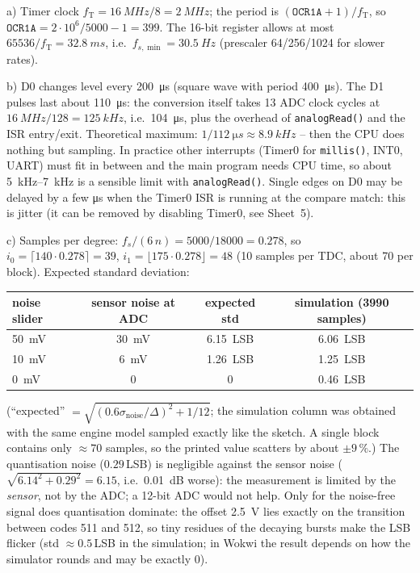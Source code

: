 \begin{solution}
a) Timer clock $f_\mathrm{T}=\SI{16}{MHz}/8=\SI{2}{MHz}$; the period is
$(\texttt{OCR1A}+1)/f_\mathrm{T}$, so $\texttt{OCR1A}=2\cdot10^6/5000-1=399$.
The 16-bit register allows at most $65536/f_\mathrm{T}=\SI{32.8}{ms}$, i.e.\
$f_{s,\min}=\SI{30.5}{Hz}$ (prescaler 64/256/1024 for slower rates).

b) D0 changes level every \SI{200}{\micro s} (square wave with period
\SI{400}{\micro s}). The D1 pulses last about \SI{110}{\micro s}: the
conversion itself takes 13 ADC clock cycles at $\SI{16}{MHz}/128=\SI{125}{kHz}$,
i.e.\ \SI{104}{\micro s}, plus the overhead of \texttt{analogRead()} and the ISR
entry/exit. Theoretical maximum: $1/\SI{112}{\micro s}\approx\SI{8.9}{kHz}$ --
then the CPU does nothing but sampling. In practice other interrupts (Timer0
for \texttt{millis()}, INT0, UART) must fit in between and the main program
needs CPU time, so about \SIrange{5}{7}{kHz} is a sensible limit with
\texttt{analogRead()}. Single edges on D0 may be delayed by a few
\si{\micro s} when the Timer0 ISR is running at the compare match: this is
jitter (it can be removed by disabling Timer0, see Sheet~5).

c) Samples per degree: $f_s/(6\,n)=5000/18000=0.278$, so
$i_0=\lceil140\cdot0.278\rceil=39$, $i_1=\lfloor175\cdot0.278\rfloor=48$
(10 samples per TDC, about 70 per block). Expected standard deviation:
\begin{center}\small
\begin{tabular}{@{}lccc@{}}\toprule
noise slider & sensor noise at ADC & expected std & simulation (3990 samples)\\\midrule
\SI{50}{mV} & \SI{30}{mV} & \SI{6.15}{LSB} & \SI{6.06}{LSB}\\
\SI{10}{mV} & \SI{6}{mV}  & \SI{1.26}{LSB} & \SI{1.25}{LSB}\\
\SI{0}{mV}  & 0 & 0 & \SI{0.46}{LSB}\\\bottomrule
\end{tabular}
\end{center}
(``expected'' $=\sqrt{(0.6\sigma_\mathrm{noise}/\Delta)^2+1/12}$; the
simulation column was obtained with the same engine model sampled exactly like
the sketch. A single block contains only $\approx70$ samples, so the printed
value scatters by about $\pm9\,\%$.) The quantisation noise
($0.29$\,LSB) is negligible against the sensor noise
($\sqrt{6.14^2+0.29^2}=6.15$, i.e.\ \SI{0.01}{dB} worse): the
measurement is limited by the \emph{sensor}, not by the ADC; a 12-bit ADC
would not help. Only for the noise-free signal does quantisation dominate:
the offset \SI{2.5}{V} lies exactly on the transition between codes 511 and
512, so tiny residues of the decaying bursts make the LSB flicker
(std $\approx0.5$\,LSB in the simulation; in Wokwi the result depends on how
the simulator rounds and may be exactly 0).


\end{solution}
